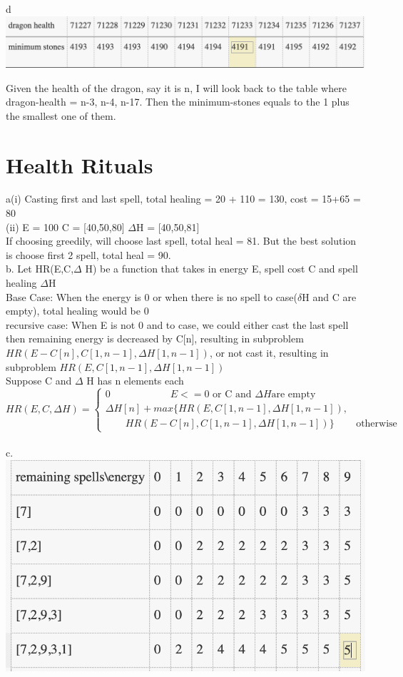 \documentclass[12pt]{article}
\begin{document}
d\\
\includegraphics[scale = 0.5]{1}

Given the health of the dragon, say it is n, I will look back to the table where dragon-health = n-3, n-4, n-17. Then the minimum-stones equals to the 1 plus the smallest one of them.


\pagebreak
\section{Health Rituals}


a(i) Casting first and last spell, total healing = 20 + 110 = 130, cost = 15+65 = 80\\
(ii) E = 100 C = [40,50,80]  $\Delta$H = [40,50,81] \\
If choosing greedily, will choose last spell, total heal = 81. But the best solution is choose first 2 spell, total heal = 90.\\

b.
Let  HR(E,C,$\Delta$ H) be a function that takes in energy E, spell cost C and spell healing $\Delta$H\\
Base Case: When the energy is 0 or when there is no spell to case($\delta$H and C are empty), total healing would be 0\\
recursive case: When E is not 0 and  to case, we could either cast the last spell then remaining energy is decreased by C[n], resulting in subproblem $HR(E-C[n],C[1,n-1],\Delta H[1,n-1])$, or not cast it, resulting in subproblem $HR(E,C[1,n-1],\Delta H[1,n-1])$\\
Suppose C and $\Delta$ H has n elements each
\[
    HR(E,C,\Delta H)= 
\begin{cases}
    0  \qquad\qquad\qquad E <= 0\text{ or C and }\Delta H \text{are empty } \\
    \Delta H[n] + max\{HR(E,C[1,n-1],\Delta H[1,n-1]), \\
    \qquad HR(E-C[n],C[1,n-1],\Delta H[1,n-1])\}        & \text{otherwise} 
\end{cases}
\]
\\
c.\\
\includegraphics[scale = 0.7]{2}
\\
\pagebreak
\end{document}
